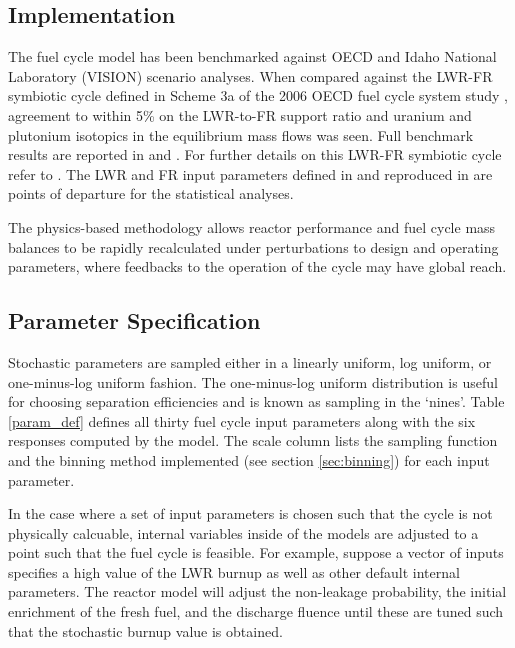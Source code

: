 \subsection{Implementation}
\label{cts_sec:implementation}

The fuel cycle model has been benchmarked against OECD and Idaho National Laboratory
(VISION) scenario analyses. When compared against the LWR-FR symbiotic cycle defined in Scheme
3a of the 2006 OECD fuel cycle system study \cite{NEA-5990}, agreement to within 5\% on the LWR-to-FR support
ratio and uranium and plutonium isotopics in the equilibrium mass flows was seen. Full benchmark
results are reported in \cite{Scopatz2009} and \cite{Li2009}.  For further details on this LWR-FR
symbiotic cycle refer to \cite{Shropshire2009}. The LWR and FR input parameters defined in
\cite{Shropshire2009} and reproduced in \cite{Scopatz2009} are points of departure for the
statistical analyses.

The physics-based methodology allows reactor performance and fuel cycle mass
balances to be rapidly recalculated under perturbations to design and operating 
parameters, where feedbacks to the operation of the cycle may have global reach.

\subsection{Parameter Specification}
\label{cts_sec:paramspec}

Stochastic parameters are sampled either in a linearly uniform, log uniform, or one-minus-log uniform fashion.
The one-minus-log uniform distribution is useful for choosing separation efficiencies and is known as sampling
in the `nines'.  Table \ref{param_def} defines all thirty fuel cycle input parameters along with the six
responses computed by the model.  The scale column lists the sampling function
and the binning method implemented (see section \ref{sec:binning}) for each input parameter.

In the case where a set of input parameters is chosen such that the cycle is not physically calcuable,
internal variables inside of the models are adjusted to a point such that the fuel cycle is feasible.
For example, suppose a vector of inputs specifies a high value of the LWR burnup as well as other default
internal parameters.  The reactor model will adjust the non-leakage probability, the initial enrichment
of the fresh fuel, and the discharge fluence until these are tuned such that the stochastic burnup value
is obtained.

